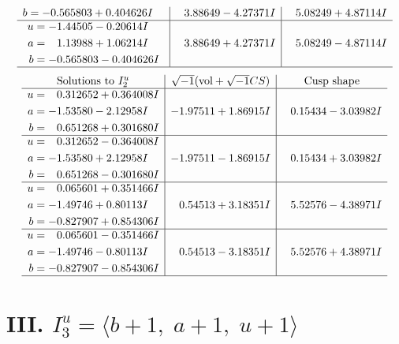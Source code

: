 \documentclass[1p]{elsarticle_modified}
\theoremstyle{definition}
\newcommand{\I}{\sqrt{-1}}
\begin{document}
$$\begin{array}{c|c|c}
\begin{aligned}
b &= -0.565803 + 0.404626 I\end{aligned}
 & \phantom{-}3.88649 - 4.27371 I & \phantom{-}5.08249 + 4.87114 I \\ \hline\begin{aligned}
u &= -1.44505 - 0.20614 I \\
a &= \phantom{-}1.13988 + 1.06214 I \\
b &= -0.565803 - 0.404626 I\end{aligned}
 & \phantom{-}3.88649 + 4.27371 I & \phantom{-}5.08249 - 4.87114 I\\
 \hline 
 \end{array}$$\newpage$$\begin{array}{c|c|c}  
\text{Solutions to }I^u_{2}& \I (\text{vol} + \sqrt{-1}CS) & \text{Cusp shape}\\
 \hline 
\begin{aligned}
u &= \phantom{-}0.312652 + 0.364008 I \\
a &= -1.53580 - 2.12958 I \\
b &= \phantom{-}0.651268 + 0.301680 I\end{aligned}
 & -1.97511 + 1.86915 I & \phantom{-}0.15434 - 3.03982 I \\ \hline\begin{aligned}
u &= \phantom{-}0.312652 - 0.364008 I \\
a &= -1.53580 + 2.12958 I \\
b &= \phantom{-}0.651268 - 0.301680 I\end{aligned}
 & -1.97511 - 1.86915 I & \phantom{-}0.15434 + 3.03982 I \\ \hline\begin{aligned}
u &= \phantom{-}0.065601 + 0.351466 I \\
a &= -1.49746 + 0.80113 I \\
b &= -0.827907 + 0.854306 I\end{aligned}
 & \phantom{-}0.54513 + 3.18351 I & \phantom{-}5.52576 - 4.38971 I \\ \hline\begin{aligned}
u &= \phantom{-}0.065601 - 0.351466 I \\
a &= -1.49746 - 0.80113 I \\
b &= -0.827907 - 0.854306 I\end{aligned}
 & \phantom{-}0.54513 - 3.18351 I & \phantom{-}5.52576 + 4.38971 I\\
 \hline 
 \end{array}$$\newpage\newpage\renewcommand{\arraystretch}{1}
\centering \section*{III. $I^u_{3}= \langle b+1,\;a+1,\;u+1 \rangle$}
\end{document}
